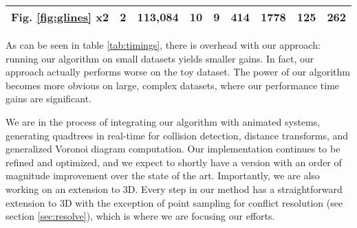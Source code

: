 \documentclass[final,3p,times,twocolumn]{elsarticle}
\begin{document}
\begin{table*}
{\begin{tabular}{lcc|cc|cc|cc}
    Fig. \ref{fig:glines} x2 & 2 & 113,084 & 10 & 9 & 414 & 1778 & 125 & 262  \\

    \bottomrule
  \end{tabular}}
  \caption{ Table of quadtree computation statistics and timings on datasets that are unmanageable using other methods. Columns are: \emph{objects} - the number of objects in the dataset; \emph{object facets} - the number of line segments (2D) of all objects in the dataset; \emph{quadtree depth} - required quadtree depth in order to resolve objects; \emph{time (ms)} - milliseconds to build the quadtree; \emph{quad cells} - number of quadtree cells. Dataset ``\ref{fig:glines} x2'' is a maze dataset increased in size by a factor of two in each dimension from \ref{fig:glines}. }
  \label{tab:timings}
\end{table*}

As can be seen in table \ref{tab:timings}, there is overhead with our approach: running our algorithm on small datasets yields smaller gains. In fact, our approach actually performs worse on the toy dataset. The power of our algorithm becomes more obvious on large, complex datasets, where our performance time gains are significant.

We are in the process of integrating our algorithm with animated systems, generating quadtrees in real-time for collision detection, distance transforms, and generalized Voronoi diagram computation. Our implementation continues to be refined and optimized, and we expect to shortly have a version with an order of magnitude improvement over the state of the art. Importantly, we are also working on an extension to 3D. Every step in our method has a straightforward extension to 3D with the exception of point sampling for conflict resolution (see section \ref{sec:resolve}), which is where we are focusing our efforts.

\end{document}
